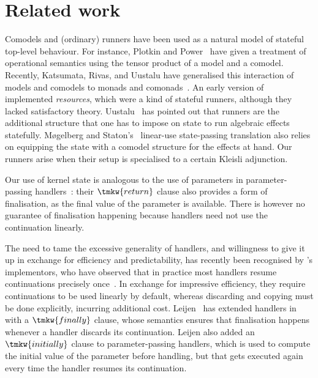 
\section{Related work}
\label{sect:relatedwork}

Comodels and (ordinary) runners have been used as a natural
model of stateful top-level behaviour.
%
For instance, Plotkin and Power~\cite{Plotkin:TensorsOfModels} have given a treatment of operational 
semantics using the tensor product of a model and a comodel.
%
Recently, Katsumata, Rivas, and Uustalu have generalised this interaction of models and comodels
to monads and comonads~\cite{Katsumata:InteractionLaws}.
%
An early version of ~\cite{Bauer:AlgebraicEffects} implemented \emph{resources},
which were a kind of stateful runners, although they lacked satisfactory theory.
%
Uustalu~\cite{Uustalu:Runners} has pointed out that runners are the additional
structure that one has to impose on state
to run algebraic effects statefully.
%
Møgelberg and Staton's~\cite{Mogelberg:LinearUsageOfState} linear-use state-passing
translation also relies on equipping the state with a comodel
structure for the effects at hand. Our runners arise
when their setup is specialised to a certain Kleisli adjunction.

Our use of kernel state is analogous to the use
of parameters in parameter-passing 
handlers~\cite{Plotkin:HandlingEffects}: their 
$\tmkw{return}$ clause also provides a form of finalisation, as the 
final value of the parameter is available.
There is however no guarantee of
finalisation happening because handlers need not use the
continuation linearly.

The need to tame the excessive generality of handlers, and willingness to
give it up in exchange for efficiency and predictability, has recently
been recognised by 's implementors, who
have observed that in practice most handlers resume 
continuations precisely once~\cite{Dolan:MulticoreOCaml}. In exchange for impressive efficiency, they require
continuations to be used linearly by default, whereas discarding and copying
must be done explicitly, incurring additional cost.
%
Leijen~\cite{Leijen:Finalisation} has extended 
handlers in  with a $\tmkw{finally}$ clause, whose 
semantics ensures that finalisation happens whenever a handler
discards its continuation.
Leijen also added an $\tmkw{initially}$ clause to
parameter-passing handlers, which is used to compute the initial value of the parameter before handling, but that 
gets executed again every time the handler resumes its continuation.


